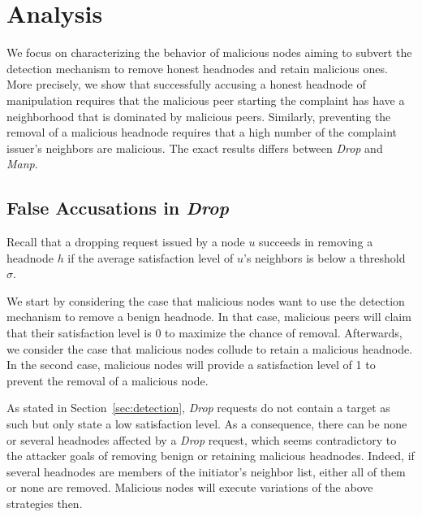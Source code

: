 \section{Analysis}
\label{sec:analysis}



We focus on characterizing the behavior of malicious nodes aiming to subvert the detection mechanism to remove honest headnodes and retain malicious ones. 
More precisely, we show that successfully accusing a honest headnode of manipulation requires that the malicious peer starting the complaint has have a neighborhood that is dominated by malicious peers. Similarly, preventing the removal of a malicious headnode requires that a high number of the complaint issuer's neighbors are malicious. 
The exact results differs between \textit{Drop} and \textit{Manp}.



\subsection{False Accusations in \textit{Drop}} 
  
Recall that a dropping request issued by a node $u$ succeeds in removing a headnode $h$ if the average satisfaction level of  $u$'s neighbors is below a threshold $\sigma$.  

We start by considering the case that malicious nodes want to use the detection mechanism to remove a benign headnode. In that case, malicious peers will claim that their satisfaction level is 0 to maximize the chance of removal. 
Afterwards, we consider the case that malicious nodes collude to retain a malicious headnode. In the second case, malicious nodes will provide a satisfaction level of 1 to prevent the removal of a malicious node.

As stated in Section~\ref{sec:detection}, \textit{Drop} requests do not contain a target as such but only state a low satisfaction level. As a consequence, there can be none or several headnodes affected by a  \textit{Drop} request, which seems contradictory to the attacker goals of removing benign or retaining malicious headnodes. Indeed, if several headnodes are members of the initiator's neighbor list, either all of them or none are removed. Malicious nodes will execute variations of the above strategies then. 

